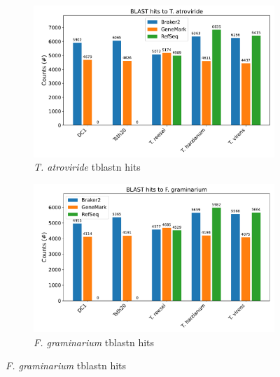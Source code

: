 \begin{figure}[htp]
  \centering
  \begin{subfigure}[b]{0.85\textwidth}
    \includegraphics[width=\textwidth]{figures/blast-tatroviride.pdf}
    \caption{\textit{T. atroviride} tblastn hits}
    \label{fig:blast-tatroviride}
  \end{subfigure}
  \par\medskip
  \begin{subfigure}[b]{0.85\textwidth}
    \includegraphics[width=\textwidth]{figures/blast-fgraminarium.pdf}
    \caption{\textit{F. graminarium} tblastn hits}
    \label{fig:blast-fgraminarium}
  \end{subfigure}
\end{figure}
